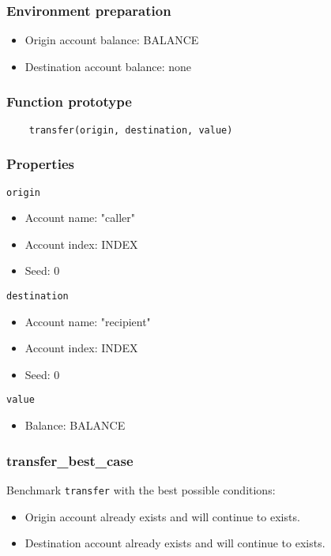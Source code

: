 \documentclass[11pt,a4paper]{article}
\begin{document}
\subsubsection*{Environment preparation}
\begin{itemize}
\item Origin account balance: BALANCE
\item Destination account balance: none
\end{itemize}

\subsubsection*{Function prototype}
\begin{verbatim}
    transfer(origin, destination, value)
\end{verbatim}

\subsubsection*{Properties}
\verb|origin|
\begin{itemize}
\item Account name: "caller"
\item Account index: INDEX
\item Seed: 0
\end{itemize}
\verb|destination|
\begin{itemize}
\item Account name: "recipient"
\item Account index: INDEX
\item Seed: 0
\end{itemize}
\verb|value|
\begin{itemize}
\item Balance: BALANCE
\end{itemize}

\subsubsection{transfer\_best\_case}

Benchmark \verb|transfer| with the best possible conditions:
\begin{itemize}
\item Origin account already exists and will continue to exists.
\item Destination account already exists and will continue to exists.
\end{itemize}
\end{document}
